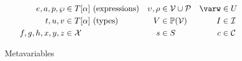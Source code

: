 \begin{figure}
\centering
\begin{align*}
e, a, p, \wp &\in T[\alpha] \ \text{(expressions)} & \upsilon, \rho &\in \mathcal{V} \cup \mathcal{P} & \varw &\in U \\
t, u, v  &\in T[\alpha] \ \text{(types)} & V &\in \mathbb{P}(\mathcal{V}) & I &\in \mathcal{I}\\
f, g, h, x, y, z &\in \mathcal{X} & s &\in S & c &\in \mathcal{C}
\end{align*}
\caption{Metavariables}
\label{fig:metavariables}
\end{figure}